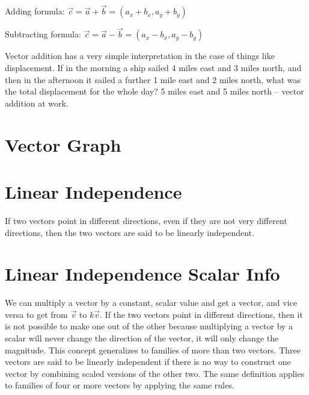 \documentclass{article}
\begin{document}
Adding formula: $\vec{c} = \vec{a} + \vec{b} = (a_x + b_x, a_y + b_y)$

Subtracting formula: $\vec{c} = \vec{a} - \vec{b} = (a_x - b_x, a_y - b_y)$

Vector addition has a very simple interpretation in the case of things like displacement. If in the morning a ship sailed 4 miles east and 3 miles north, and then in the afternoon it sailed a further 1 mile east and 2 miles north, what was the total displacement for the whole day? 5 miles east and 5 miles north – vector addition at work.
\section{Vector Graph}

\section{Linear Independence}
If two vectors point in different directions, even if they are not very different directions, then the two vectors are said to be linearly independent.

\section{Linear Independence Scalar Info}
We can multiply a vector by a constant, scalar value and get a vector, and vice versa to get from $\vec{v}$ to $k\vec{v}$. If the two vectors point in different directions, then it is not possible to make one out of the other because multiplying a vector by a scalar will never change the direction of the vector, it will only change the magnitude. This concept generalizes to families of more than two vectors. Three vectors are said to be linearly independent if there is no way to construct one vector by combining scaled versions of the other two. The same definition applies to families of four or more vectors by applying the same rules.
\end{document}
